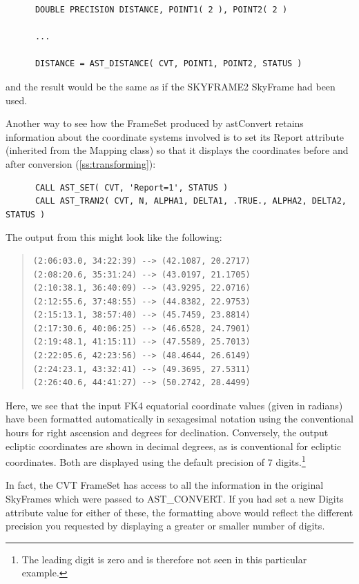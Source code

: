 \documentclass[twoside,11pt]{article}
\newcommand{\htmlref}[2]{#1}
\newcommand{\secref}[1]{\S\ref{#1}}
\renewcommand{\secref}[1]{\ref{#1}}
\begin{document}
\small
\begin{verbatim}
      DOUBLE PRECISION DISTANCE, POINT1( 2 ), POINT2( 2 )

      ...

      DISTANCE = AST_DISTANCE( CVT, POINT1, POINT2, STATUS )
\end{verbatim}
\normalsize

and the result would be the same as if the SKYFRAME2 SkyFrame had been
used.

Another way to see how the FrameSet produced by astConvert retains
information about the coordinate systems involved is to set its \htmlref{Report}{Report}
attribute (inherited from the Mapping class) so that it displays the
coordinates before and after conversion (\secref{ss:transforming}):

\small
\begin{verbatim}
      CALL AST_SET( CVT, 'Report=1', STATUS )
      CALL AST_TRAN2( CVT, N, ALPHA1, DELTA1, .TRUE., ALPHA2, DELTA2, STATUS )
\end{verbatim}
\normalsize

The output from this might look like the following:

\begin{quote}
\begin{verbatim}
(2:06:03.0, 34:22:39) --> (42.1087, 20.2717)
(2:08:20.6, 35:31:24) --> (43.0197, 21.1705)
(2:10:38.1, 36:40:09) --> (43.9295, 22.0716)
(2:12:55.6, 37:48:55) --> (44.8382, 22.9753)
(2:15:13.1, 38:57:40) --> (45.7459, 23.8814)
(2:17:30.6, 40:06:25) --> (46.6528, 24.7901)
(2:19:48.1, 41:15:11) --> (47.5589, 25.7013)
(2:22:05.6, 42:23:56) --> (48.4644, 26.6149)
(2:24:23.1, 43:32:41) --> (49.3695, 27.5311)
(2:26:40.6, 44:41:27) --> (50.2742, 28.4499)
\end{verbatim}
\end{quote}

Here, we see that the input FK4 equatorial coordinate values (given in
radians) have been formatted automatically in sexagesimal notation
using the conventional hours for right ascension and degrees for
declination. Conversely, the output ecliptic coordinates are shown in
decimal degrees, as is conventional for ecliptic coordinates. Both are
displayed using the default precision of 7 digits.\footnote{The
leading digit is zero and is therefore not seen in this particular
example.}

In fact, the CVT FrameSet has access to all the information in the
original SkyFrames which were passed to AST\_CONVERT. If you had set a
new Digits attribute value for either of these, the formatting above
would reflect the different precision you requested by displaying a
greater or smaller number of digits.
\end{document}
